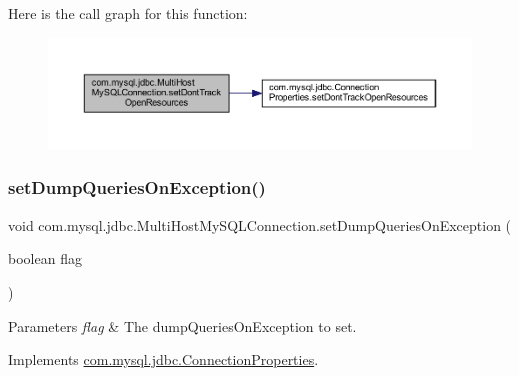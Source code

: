 Here is the call graph for this function\+:
\nopagebreak
\begin{figure}[H]
\begin{center}
\leavevmode
\includegraphics[width=350pt]{classcom_1_1mysql_1_1jdbc_1_1_multi_host_my_s_q_l_connection_a1a0edce81558c2e961ddf936a2410fe3_cgraph}
\end{center}
\end{figure}
\mbox{\label{classcom_1_1mysql_1_1jdbc_1_1_multi_host_my_s_q_l_connection_ad62d20e58b21ef53f69e1c7c39325ef8}} 
\subsubsection{\texorpdfstring{set\+Dump\+Queries\+On\+Exception()}{setDumpQueriesOnException()}}
{\footnotesize\ttfamily void com.\+mysql.\+jdbc.\+Multi\+Host\+My\+S\+Q\+L\+Connection.\+set\+Dump\+Queries\+On\+Exception (\begin{DoxyParamCaption}\item[{boolean}]{flag }\end{DoxyParamCaption})}


\begin{DoxyParams}{Parameters}
{\em flag} & The dump\+Queries\+On\+Exception to set. \\
\hline
\end{DoxyParams}


Implements \mbox{\hyperlink{interfacecom_1_1mysql_1_1jdbc_1_1_connection_properties_a4bdf459325c8a9a96459959ea493f6a3}{com.\+mysql.\+jdbc.\+Connection\+Properties}}.

